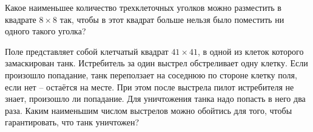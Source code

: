 \documentclass{article}
\begin{document}
\begin{enumerate_boxed}
        \item Какое наименьшее количество трехклеточных уголков можно разместить в квадрате $8 \times 8$ так, чтобы в этот квадрат больше нельзя было поместить ни одного такого уголка?

        \item Поле представляет собой клетчатый квадрат $41 \times 41$, в одной из клеток которого замаскирован танк.
        Истребитель за один выстрел обстреливает одну клетку.
        Если произошло попадание, танк переползает на соседнюю по стороне клетку поля, если нет – остаётся на месте.
        При этом после выстрела пилот истребителя не знает, произошло ли попадание.
        Для уничтожения танка надо попасть в него два раза.
        Каким наименьшим числом выстрелов можно обойтись для того, чтобы гарантировать, что танк уничтожен?


    \end{enumerate_boxed}
\end{document}
